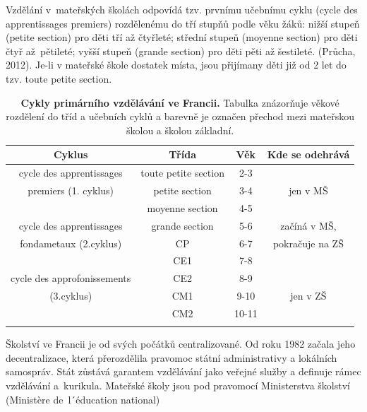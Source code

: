 		Vzdělání v mateřských školách odpovídá tzv. prvnímu učebnímu cyklu (cycle des apprentissages premiers) rozdělenému do tří stupňů podle věku žáků: nižší stupeň (petite section) pro děti tří až čtyřleté; střední stupeň (moyenne section) pro děti čtyř až pětileté; vyšší stupeň (grande section) pro děti pěti až šestileté.
		(Průcha, 2012). 
		Je-li v mateřské škole dostatek místa, jsou přijímany děti již od 2 let do tzv. toute petite section. 

\begin{spacing}{1.0}
\begin{table}[h]
	\small
	\begin{center}
	\begin{tabular}{|c|ccc|}
		\hline
		\rowcolor{grey}
		\textbf{Cyklus}				& \textbf{Třída}		& \textbf{Věk}	& \textbf{Kde se odehrává}	\\
		\hline
		\hline
		\rowcolor{grey!10}
	\cellcolor{white} cycle des apprentissages	& toute petite section 	& 2-3 		&				\\ \rowcolor{grey!20}
	\cellcolor{white} premiers (1. cyklus)		& petite section 		& 3-4 		& jen v MŠ 		\\ \rowcolor{grey!20}
	\cellcolor{white}							& moyenne section 		& 4-5 		& 				\\ \rowcolor{grey!20}
		\hline
	\cellcolor{white} cycle des apprentissages 	& grande section 		& 5-6 		& začíná v MŠ, 		\\ \rowcolor{grey!50}
	\cellcolor{white} fondametaux (2.cyklus) 		& CP 					& 6-7 		& pokračuje na ZŠ 	\\ \rowcolor{grey!50}
	\cellcolor{white}								& CE1 					& 7-8 		& 					\\ \rowcolor{grey!50}
		\hline
	\cellcolor{white} cycle des approfonissements & CE2 					& 8-9 		&					\\ \rowcolor{grey!50}
	\cellcolor{white} (3.cyklus)					& CM1 					& 9-10 		& jen v ZŠ 			\\ \rowcolor{grey!50}
	\cellcolor{white}								& CM2 					& 10-11 	& 					\\ \rowcolor{grey!50}
		\hline
	\end{tabular}
	\end{center}
	\caption{ \textbf{Cykly primárního vzdělávání ve Francii.} Tabulka znázorňuje věkové rozdělení do tříd a učebních cyklů a barevně je označen přechod mezi mateřskou školou a školou základní. 
	}
	\label{tab:rozdeleniTridFR}
\end{table}
\end{spacing}
		Školství ve Francii je od svých počátků centralizované. Od roku 1982 začala jeho decentralizace, která přerozdělila pravomoc státní administrativy a lokálních samospráv. Stát zůstává garantem vzdělávání jako veřejné služby a definuje rámec vzdělávání a kurikula. Mateřské školy jsou pod pravomocí Ministerstva školství (Ministère de l´éducation national)


